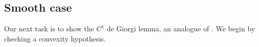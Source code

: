 \documentclass[reqno,10pt]{amsart}
\DeclareMathOperator{\Exc}{Exc}
\newcommand*\dif{\mathop{}\!\mathrm{d}}
\newtheorem{lemma}[theorem]{Lemma}
\theoremstyle{definition}
\numberwithin{equation}{section}
\begin{document}


\subsection{Smooth case} 
Our next task is to show the $C^1$ de Giorgi lemma, an analogue of \cite[Teorema 4.4]{Miranda66}.
We begin by checking a convexity hypothesis.
\end{document}
